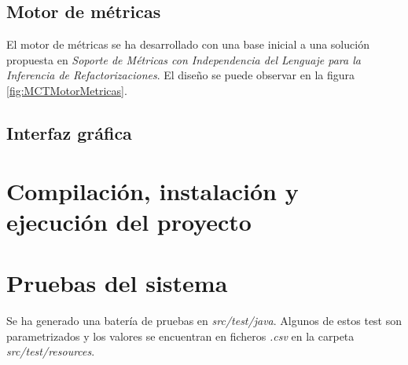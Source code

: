 \subsection{Motor de métricas}
El motor de métricas se ha desarrollado con una base inicial a una solución propuesta en \textit{Soporte de Métricas con Independencia del Lenguaje para la Inferencia de Refactorizaciones}\cite{marticorena_soporte_2005}. El diseño se puede observar en la figura \ref{fig:MCTMotorMetricas}.

\subsection{Interfaz gráfica}

\section{Compilación, instalación y ejecución del proyecto}

\section{Pruebas del sistema}
Se ha generado una batería de pruebas en \textit{src/test/java}. Algunos de estos test son parametrizados y los valores se encuentran en ficheros \textit{.csv} en la carpeta \textit{src/test/resources}.
